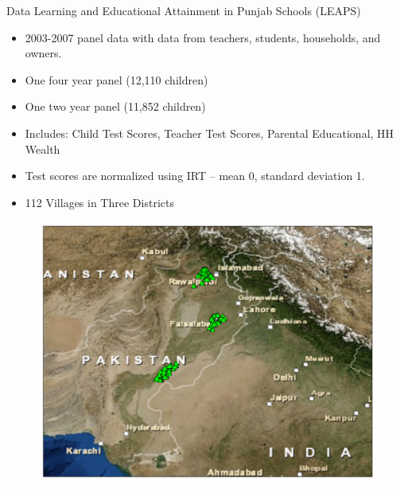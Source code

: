 \documentclass{beamer}
\begin{document}
\begin{frame}{Data}	
Learning and Educational Attainment in Punjab Schools (LEAPS)
\begin{itemize}
	\item 2003-2007 panel data with data from teachers, students, households, and owners.
	\item One four year panel (12,110 children)
	\item One two year panel (11,852 children)
	\item Includes: Child Test Scores, Teacher Test Scores, Parental Educational, HH Wealth
	\item Test scores are normalized using IRT -- mean 0, standard deviation 1.
	\item 112 Villages in Three Districts
\end{itemize}
\end{frame}

\begin{frame}{}
	\begin{figure}[htb]
		\begin{center}
		\includegraphics[scale=0.4]{maps/hh_map_allpak.pdf}
		\end{center}
	\end{figure}
\end{frame}
\end{document}
